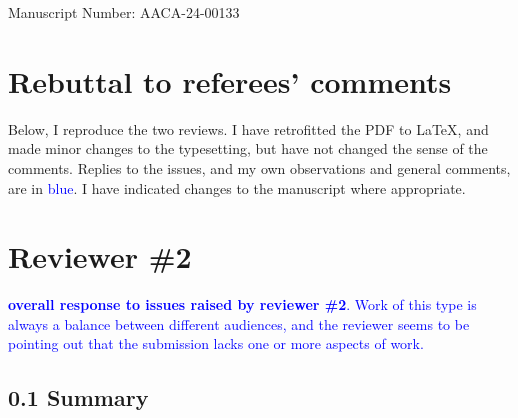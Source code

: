 \documentclass{article}
\begin{document}
Manuscript Number: AACA-24-00133

\section*{Rebuttal to referees' comments}

Below, I reproduce the two reviews.  I have retrofitted the PDF to
\LaTeX, and made minor changes to the typesetting, but have not
changed the sense of the comments.  Replies to the issues, and my own
observations and general comments, are in \textcolor{blue}{blue}.  I
have indicated changes to the manuscript where appropriate.


\section*{Reviewer \#2}

\textcolor{blue}{ {\bf overall response to issues raised by reviewer
    \#2}.  Work of this type is always a balance between different
  audiences, and the reviewer seems to be pointing out that the
  submission lacks one or more aspects of work.}


\subsection*{0.1 Summary}
\end{document}
